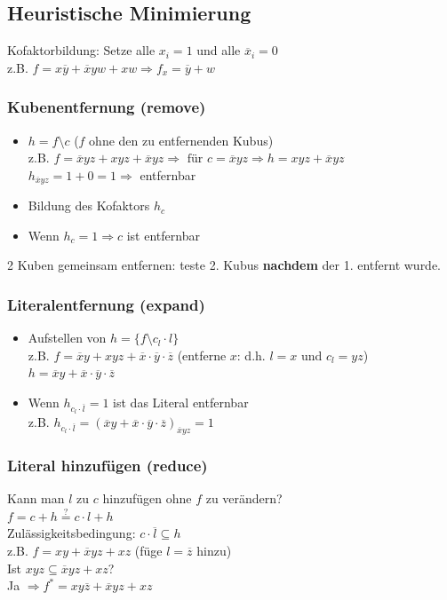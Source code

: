 \documentclass[6pt,a4paper]{scrartcl}
\newcommand{\eset}[1]{\ensuremath{\bigl\{#1\bigr\}}}								%
\newcommand{\ol}[1]{\ensuremath{\overline{#1}}}									%
\newcommand{\Ra}[0]{\ensuremath{\Rightarrow}}									%
\begin{document}
\begin{multicols}{3}
\subsection{Heuristische Minimierung}
Kofaktorbildung: Setze alle $x_i = 1$ und alle $\overline x_i = 0$ \\
z.B. $f = x\overline y + \overline x yw + x w \Ra f_x = \overline y + w$


\subsubsection{Kubenentfernung (remove)}
\begin{itemize}
	\item $h = f \setminus c$ ($f$ ohne den zu entfernenden Kubus) \\
	z.B. $ f = \overline x y z+ x y z + \overline x  yz \Ra \text{ für } c = \overline x y z \Ra h =  xyz + \overline x y z$ \\
	$h_{\ol xyz} = 1 + 0 = 1 \Ra$ entfernbar
	\item Bildung des Kofaktors $h_c$
	\item Wenn $h_c = 1 \Ra c$ ist entfernbar
\end{itemize}
2 Kuben gemeinsam entfernen: teste 2. Kubus \textbf{nachdem} der 1. entfernt wurde.
\subsubsection{Literalentfernung (expand)}

\begin{itemize}
	\item Aufstellen von $h = \eset{f \setminus c_l \cdot l}$ \\
	z.B. $ f = \overline x y + x y z + \overline x \cdot \overline y \cdot \overline z$ (entferne $x$: d.h. $l = x$ und $c_l = yz$) \\ 
	$h = \overline x y  + \overline x \cdot \overline y \cdot \overline z$
	\item Wenn $h_{c_l \cdot \overline l} = 1$ ist das Literal entfernbar \\
	z.B. $h_{c_l \cdot \overline l} = (\overline x y  + \overline x \cdot \overline y \cdot \overline z)_{\overline x y z} = 1$
\end{itemize}

\subsubsection{Literal hinzufügen (reduce)}
Kann man $l$ zu $c$ hinzufügen ohne $f$ zu verändern? \\
$f = c + h \overset{?}{=} c \cdot l + h$
\\ Zulässigkeitsbedingung: $c \cdot \overline l \subseteq h$ \\
z.B. $f = xy + \overline x y z + xz$ (füge $l = \overline z$ hinzu) \\
Ist $xyz \subseteq \overline x yz + xz$? \\
Ja $\Ra f^* = xy \overline z + \overline x yz + xz$


\end{multicols}
\end{document}
